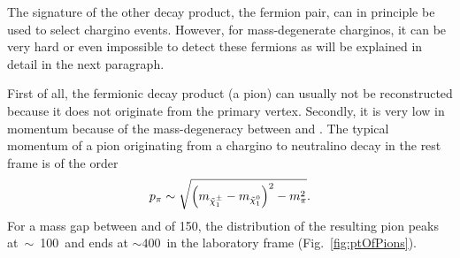 The signature of the other decay product, the fermion pair, can in principle be used to select chargino events. 
However, for mass-degenerate charginos, it can be very hard or even impossible to detect these fermions as will be explained in detail in the next paragraph.

First of all, the fermionic decay product (\eg a pion) can usually not be reconstructed because it does not originate from the primary vertex.
Secondly, it is very low in momentum because of the mass-degeneracy between \chipm and \chiO.
The typical momentum of a pion originating from a chargino to neutralino decay in the \chipm rest frame is of the order 
\begin{equation}
p_{\pi}\sim \sqrt{ \left( m_{\tilde{\chi}^{\pm}_{1}} - m_{\tilde{\chi}^{0}_{1}} \right)^2 - m_{\pi}^2}.
\end{equation}
For a mass gap between \chipm and \chiO of 150\mev, the \pt distribution of the resulting pion peaks \mbox{at $\sim$ 100\,\mev} and ends at \mbox{\pt $\sim 400\,$\mev} in the laboratory frame (Fig.~\ref{fig:ptOfPions}).


